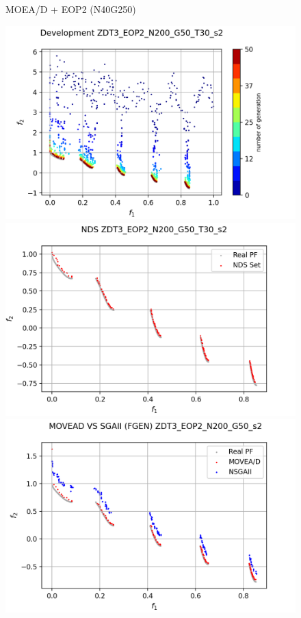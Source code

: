 \begin{minipage}[H]{\linewidth}
\begin{minipage}[b]{0.3\linewidth}
\begin{figure}[H]
        \caption{\centering MOEA/D + EOP2 (N40G250)}
        \label{fig:11}
    \end{figure}
\end{minipage} \quad
\begin{minipage}[b]{0.3\linewidth}
    \begin{figure}[H]
        \centering
        \includegraphics[scale=0.4]{figures/ZDT3_EOP2_N200_G50_T30/s2_dev.png}\\
        \includegraphics[scale=0.36]{figures/ZDT3_EOP2_N200_G50_T30/s2_nds.png}\\
        \includegraphics[scale=0.36]{figures/ZDT3_EOP2_N200_G50_T30/s2_comp.png}\\

\end{figure}
\end{minipage}
\end{minipage}
